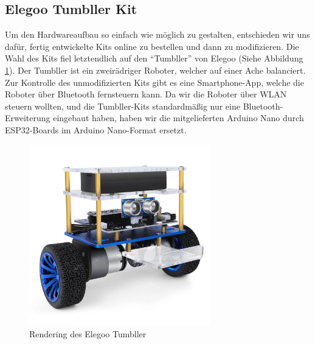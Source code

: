 \documentclass[12pt]{article}
\begin{document}
	\subsection{Elegoo Tumbller Kit}
	\label{elegoo_tumbller}
	Um den Hardwareaufbau so einfach wie möglich zu gestalten,
	entschieden wir uns dafür,
	fertig entwickelte Kits online zu bestellen und dann zu modifizieren.
	Die Wahl des Kits fiel letztendlich auf den ``Tumbller'' von Elegoo (Siehe Abbildung \ref{fig:elegoo_tumbller}).
	Der Tumbller ist ein zweirädriger Roboter, welcher auf einer Ache balanciert.
	Zur Kontrolle des unmodifizierten Kits gibt es eine Smartphone-App,
	welche die Roboter über Bluetooth fernsteuern kann.
	Da wir die Roboter über WLAN steuern wollten, 
	und die Tumbller-Kits standardmäßig nur eine Bluetooth-Erweiterung eingebaut haben,
	haben wir die mitgelieferten Arduino Nano durch ESP32-Boards im Arduino Nano-Format ersetzt.
	\begin{figure}[H]
		\includegraphics[width=0.7\textwidth, center]{img/elegoo_tumbller.png}
		\caption{Rendering des Elegoo Tumbller}
		\label{fig:elegoo_tumbller}
	\end{figure}
\end{document}

